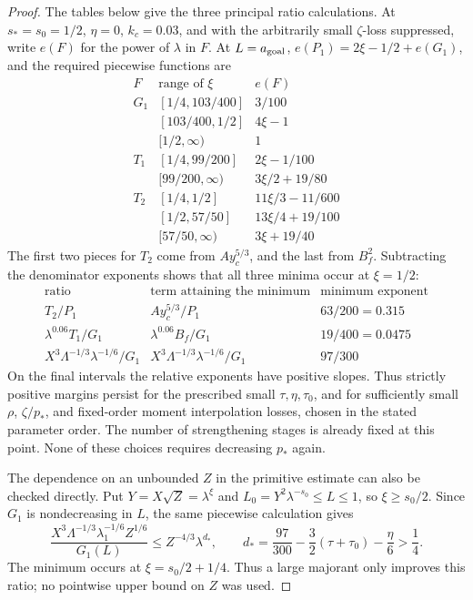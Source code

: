 \begin{proof}
The tables below give the three principal ratio calculations. At
\(s_*=s_0=1/2\), \(\eta=0\), \(k_c=0.03\), and with the
arbitrarily small \(\zeta\)-loss suppressed, write \(e(F)\) for
the power of \(\lambda\) in \(F\). At \(L=a_{\rm goal}\),
\(e(P_1)=2\xi-1/2+e(G_1)\), and the required piecewise functions are
\[
\begin{array}{c|c|c}
 F&\text{range of }\xi&e(F)\\ \hline
 G_1 &[1/4,103/400]&3/100\\
     &[103/400,1/2]&4\xi-1\\
     &[1/2,\infty)&1\\ \hline
 T_1 &[1/4,99/200]&2\xi-1/100\\
     &[99/200,\infty)&3\xi/2+19/80\\ \hline
 T_2 &[1/4,1/2]&11\xi/3-11/600\\
     &[1/2,57/50]&13\xi/4+19/100\\
     &[57/50,\infty)&3\xi+19/40
\end{array}
\]
The first two pieces for \(T_2\) come from \(Ay_c^{5/3}\), and
the last from \(B_f^2\). Subtracting the denominator exponents
shows that all three minima occur at \(\xi=1/2\):
\[
\begin{array}{c|c|c}
 \text{ratio}&\text{term attaining the minimum}&\text{minimum exponent}\\ \hline
 T_2/P_1&Ay_c^{5/3}/P_1&63/200=0.315\\
 \lambda^{0.06}T_1/G_1&\lambda^{0.06}B_f/G_1&19/400=0.0475\\
 X^3\Lambda^{-1/3}\lambda^{-1/6}/G_1
   &X^3\Lambda^{-1/3}\lambda^{-1/6}/G_1&97/300
\end{array}
\]
On the final intervals the relative exponents have positive slopes.
Thus strictly positive margins persist for the prescribed small
\(\tau,\eta,\tau_0\), and for
sufficiently small \(\rho\), \(\zeta/p_*\), and fixed-order moment
interpolation losses, chosen in the stated parameter order.  The number of strengthening stages is already
fixed at this point.  None of these choices requires decreasing \(p_*\)
again.

The dependence on an unbounded \(Z\) in the primitive estimate can
also be checked directly. Put \(Y=X\sqrt Z=\lambda^\xi\) and
\(L_0=Y^2\lambda^{-s_0}\le L\le1\), so \(\xi\ge s_0/2\).
Since \(G_1\) is nondecreasing in \(L\), the same piecewise
calculation gives
\[
 \frac{X^3\Lambda^{-1/3}\lambda_1^{-1/6}Z^{1/6}}{G_1(L)}
 \le Z^{-4/3}\lambda^{d_*},\qquad
 d_* =\frac{97}{300}-\frac32(\tau+\tau_0)-\frac\eta6>\frac14.
\]
The minimum occurs at \(\xi=s_0/2+1/4\). Thus a large majorant
only improves this ratio; no pointwise upper bound on \(Z\) was used.

\end{proof}




